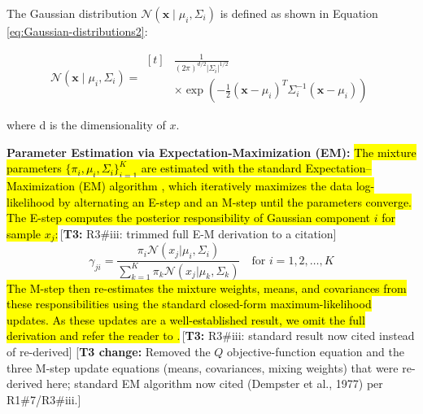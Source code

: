 \documentclass[lettersize,journal]{IEEEtran}
\newcommand{\tchange}[2]{\hl{#1}\,\textcolor{tier3note}{\footnotesize[\textbf{T3:} #2]}}
\newcommand{\tnote}[1]{\textcolor{tier3note}{\footnotesize[\textbf{T3 change:} #1]}}
\begin{document}
	The Gaussian distribution $\mathcal{N}\left(\mathbf{x} \mid \mu_i, {\Sigma}_i\right)$ is defined as shown in Equation \ref{eq:Gaussian-distributions2}:
	
	\begin{equation}
		\label{eq:Gaussian-distributions2}
		\mathcal{N}\left(\mathbf{x} \mid \mu_i, {\Sigma}_i\right) = 
		\begin{aligned}[t]
			&\frac{1}{(2 \pi)^{d / 2}\left|{\Sigma}_i\right|^{1 / 2}} \\
			&\times \exp \left(-\frac{1}{2}\left(\mathbf{x}-\mu_i\right)^T {\Sigma}_i^{-1}\left(\mathbf{x}-\mu_i\right)\right)
		\end{aligned}
	\end{equation}
	
	
	where d is the dimensionality of $x$.
	
		\textbf{Parameter Estimation via Expectation-Maximization (EM):}
		\tchange{The mixture parameters \mbox{$\{\pi_i, \mu_i, \Sigma_i\}_{i=1}^{K}$} are estimated with the standard Expectation--Maximization (EM) algorithm \mbox{\cite{dempster_maximum_1977}}, which iteratively maximizes the data log-likelihood by alternating an E-step and an M-step until the parameters converge. The E-step computes the posterior responsibility of Gaussian component \mbox{$i$} for sample \mbox{$x_j$}:}{R3\#iii: trimmed full E-M derivation to a citation}
		\begin{equation}\label{eq:E-Step}
			\gamma_{ji} = \frac{\pi_i \mathcal{N}(x_j | \mu_i, \Sigma_i)}{\sum_{k=1}^{K} \pi_k \mathcal{N}(x_j | \mu_k, \Sigma_k)} \quad \text{for } i = 1, 2, \dots, K
		\end{equation}
		\tchange{The M-step then re-estimates the mixture weights, means, and covariances from these responsibilities using the standard closed-form maximum-likelihood updates. As these updates are a well-established result, we omit the full derivation and refer the reader to \mbox{\cite{dempster_maximum_1977}}.}{R3\#iii: standard result now cited instead of re-derived}
		\tnote{Removed the $Q$ objective-function equation and the three M-step update equations (means, covariances, mixing weights) that were re-derived here; standard EM algorithm now cited (Dempster et al., 1977) per R1\#7/R3\#iii.}
	
\end{document}
